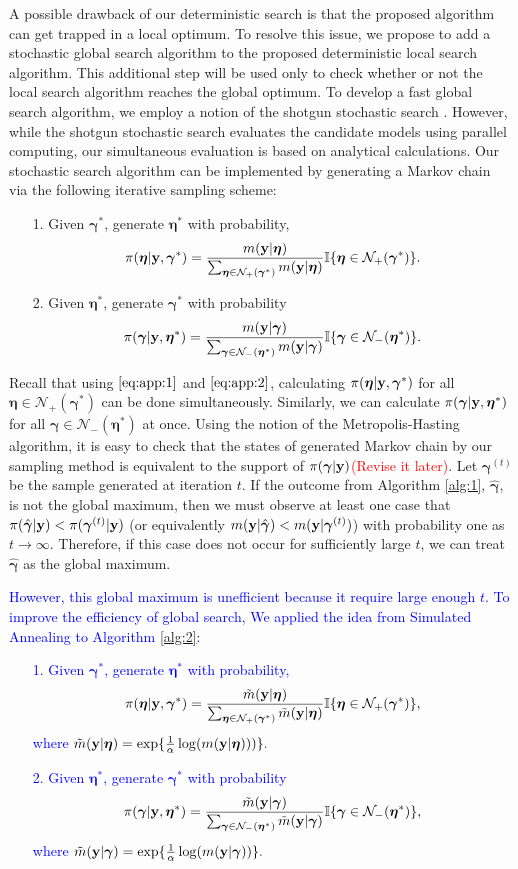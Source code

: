 \documentclass[12pt]{article}
\def\uy{{\bf y}}
\def\bg{{\boldsymbol \gamma}}
\def\ueta{{\boldsymbol \eta}}
\def\ueta{{\boldsymbol \eta}}
\begin{document}
A possible drawback of our deterministic search is that the proposed algorithm can get trapped in a local optimum. To resolve this issue, we propose to add a stochastic global search algorithm to the proposed deterministic local search algorithm. This additional step will be used only to check whether or not the local search algorithm reaches the global optimum. To develop a fast global search algorithm, we employ a notion of the shotgun stochastic search \citep{hans2007shotgun}. However, while the shotgun stochastic search evaluates the candidate models using parallel computing, our simultaneous evaluation is based on analytical calculations. Our stochastic search algorithm can be implemented by generating a Markov chain via the following iterative sampling scheme:
\begin{itemize}
 \item[1.] Given $\bg^*$, generate $\ueta^*$ with probability,
       $$\pi(\ueta|\uy,\bg^*)=\frac{m(\uy|\ueta)}{\sum_{\ueta \in \mathcal{N}_+(\bg^* )  } m(\uy|\ueta) }\mathbb{I}\{\ueta \in \mathcal{N}_+(\bg^* ) \}.$$
 \item[2.] Given $\ueta^*$, generate $\bg^*$ with probability
       $$\pi(\bg|\uy,\ueta^*)=\frac{m(\uy|\bg)}{\sum_{\bg \in \mathcal{N}_-({\ueta}^* )  } m(\uy|\bg) }\mathbb{I}\{\bg \in \mathcal{N}_-({\ueta}^* )   \}.$$
\end{itemize}
Recall that  using $\eqref{eq:app:1}$ and  $\eqref{eq:app:2}$, calculating $\pi(\ueta|\uy,\bg^*)$ for all $\ueta \in \mathcal{N}_+(\bg^* )$ can be done simultaneously. Similarly, we can calculate $\pi(\bg|\uy,\ueta^*)$ for all $\bg \in \mathcal{N}_-({\ueta}^* ) $ at once.
Using the notion of the Metropolis-Hasting algorithm, it is easy to check that the states of generated Markov chain by our sampling method is equivalent to the support of $\pi(\bg|\uy)$\textcolor{red}{(Revise it later)}. Let $\bg^{(t)}$ be the sample generated at iteration $t$. If the outcome from Algorithm \ref{alg:1}, $\hat{\bg}$, is not the global maximum, then we must observe at least one case that $\pi(\hat{\bg}|\uy)< \pi(\bg^{(t)}|\uy)$ (or equivalently $m(\uy|\hat{\bg})<m(\uy|\bg^{(t)})$) with probability one as $t\to \infty$. Therefore, if this case does not occur for sufficiently large $t$, we can treat $\hat{\bg}$ as the global maximum.
\textcolor{blue}{However, this global maximum is unefficient because it require large enough $t$. To improve the efficiency of global search, We applied the idea from Simulated Annealing to Algorithm \ref{alg:2}:
\begin{itemize}
 \item[1.] Given $\bg^*$, generate $\ueta^*$ with probability,
       $$\pi(\ueta|\uy,\bg^*)=\frac{\tilde{m}(\uy|\ueta)}{\sum_{\ueta \in \mathcal{N}_+(\bg^* )  } \tilde{m}(\uy|\ueta) }\mathbb{I}\{\ueta \in \mathcal{N}_+(\bg^* ) \},$$ where $\tilde{m}(\uy|\ueta)=\exp\{\frac{1}{\alpha}\log(m(\uy|\ueta)))\}.$ \\
 \item[2.] Given $\ueta^*$, generate $\bg^*$ with probability
       $$\pi(\bg|\uy,\ueta^*)=\frac{\tilde{m}(\uy|\bg)}{\sum_{\bg \in \mathcal{N}_-({\ueta}^* )  } \tilde{m}(\uy|\bg) }\mathbb{I}\{\bg \in \mathcal{N}_-({\ueta}^* )  \},$$ where $\tilde{m}(\uy|\bg)=\exp\{\frac{1}{\alpha}\log(m(\uy|\bg))\}.$
\end{itemize}
}
\end{document}
